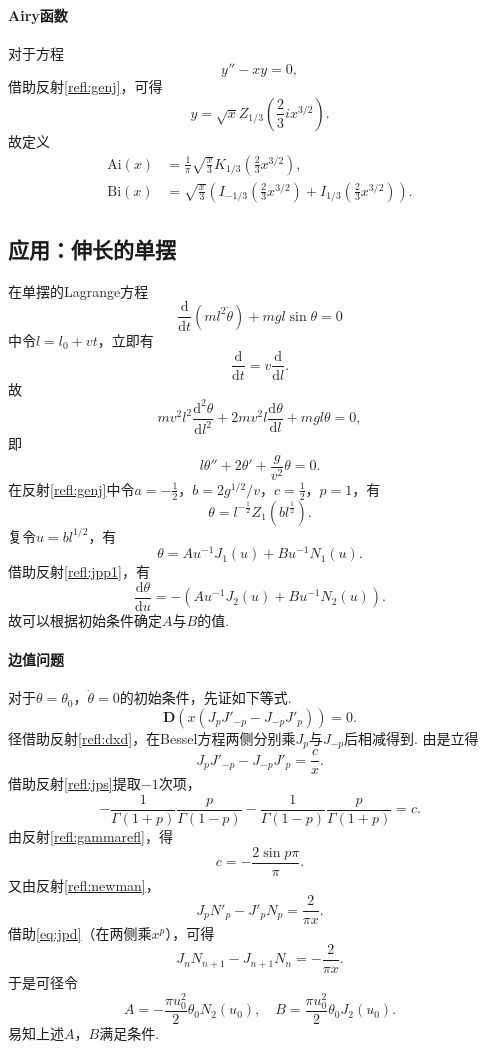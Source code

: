 \documentclass[UTF-8]{ctexart}
\newcommand{\dd}{\mathrm{d}}
\newcommand{\de}[2]{\frac{\dd #1}{\dd #2}}
\newcommand{\dde}[2]{\frac{\dd^2 #1}{\dd #2^2}}
\newcommand{\dt}[1]{\frac{\mathrm{d}#1}{\mathrm{d}t}}
\newcommand{\pare}[1]{\left(#1\right)}
\newcommand{\half}{\frac{1}{2}}
\newcommand{\DD}{\mathbf{D}}
\newcommand{\rec}[1]{\frac{1}{#1}}
\newcommand{\Ai}{\text{Ai}}
\newcommand{\Bi}{\text{Bi}}
\newcommand{\rref}[1]{反射\ref{refl:#1}}
\begin{document}
  \paragraph{Airy函数}对于方程
  \[ y''-xy=0, \]
  借助\rref{genj}，可得
  \[ y = \sqrt{x}Z_{1/3}\pare{\frac{2}{3}ix^{3/2}}. \]
  故定义
  \begin{align*}
    \Ai\pare{x} &= \rec{\pi}\sqrt{\frac{x}{3}}K_{1/3}\pare{\frac{2}{3}x^{3/2}},\\
    \Bi\pare{x} &= \sqrt{\frac{x}{3}}\pare{I_{-1/3}\pare{\frac{2}{3}x^{3/2}}+I_{1/3}\pare{\frac{2}{3}x^{3/2}}}.
  \end{align*}
  \subsection{应用：伸长的单摆}
  在单摆的Lagrange方程
  \[ \dt{}\pare{ml^2\dot{\theta}} + mgl\sin\theta = 0 \]
  中令$l = l_0 + vt $，立即有
  \[ \dt{} = v\de{}{l}. \]
  故
  \[ mv^2l^2 \dde{\theta}{l} + 2mv^2l\de{\theta}{l} + mgl\theta = 0, \]
  即
  \[ l \theta'' + 2\theta' + \frac{g}{v^2}\theta = 0. \]
  在\rref{genj}中令$a=-\half$，$b=2g^{1/2}/v$，$c=\half$，$p=1$，有
  \[ \theta=l^{-\half}Z_1\pare{bl^{\half}}. \]
  复令$u=bl^{1/2}$，有
  \[ \theta = Au^{-1}J_1\pare{u} + Bu^{-1}N_1\pare{u}. \]
  借助\rref{jpp1}，有
  \[ \de{\theta}{u} = -\pare{Au^{-1}J_2\pare{u} + Bu^{-1}N_2\pare{u}}. \]
  故可以根据初始条件确定$A$与$B$的值. 
  \paragraph{边值问题}对于$\theta=\theta_0$，$\dot{\theta}=0$的初始条件，先证如下等式.
  \[ \DD\pare{x\pare{J_pJ'_{-p}-J_{-p}J'_p}} = 0. \]
  径借助\rref{dxd}，在Bessel方程两侧分别乘$J_p$与$J_{-p}$后相减得到. 由是立得
  \[ J_pJ'_{-p}-J_{-p}J'_p = \frac{c}{x}. \]
  借助\rref{jps}提取$-1$次项，
  \[ -\frac{1}{\Gamma\pare{1+p}}\frac{p}{\Gamma\pare{1-p}} - \frac{1}{\Gamma\pare{1-p}}\frac{p}{\Gamma\pare{1+p}} = c. \]
  由\rref{gammarefl}，得
  \[ c = -\frac{2 \sin p\pi}{\pi}. \]
  又由\rref{newman}，
  \[ J_pN'_p-J'_pN_p = \frac{2}{\pi x}. \]
  借助\eqref{eq:jpd}（在两侧乘$x^p$），可得
  \[ J_nN_{n+1} - J_{n+1}N_n = -\frac{2}{\pi x}. \]
  于是可径令
  \[ A=-\frac{\pi u_0^2}{2}\theta_0N_2\pare{u_0},\quad B = \frac{\pi u_0^2}{2}\theta_0J_2\pare{u_0}. \]
  易知上述$A$，$B$满足条件.
\end{document}
